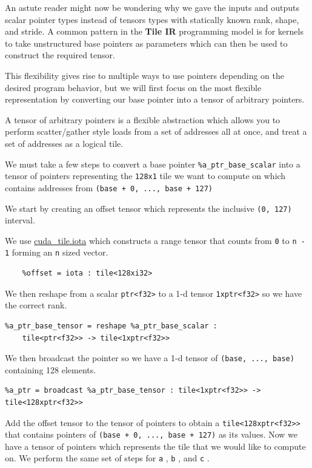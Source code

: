 \documentclass{article}
\begin{document}
An astute reader might now be wondering why we gave the inputs and outputs scalar pointer types instead of tensors types with statically known rank, shape, and stride. A common pattern in the \textbf{Tile IR} programming model is for kernels to take unstructured base pointers as parameters which can then be used to construct the required tensor.

This flexibility gives rise to multiple ways to use pointers depending on the desired program behavior, but we will first focus on the most flexible representation by converting our base pointer into a tensor of arbitrary pointers.

A tensor of arbitrary pointers is a flexible abstraction which allows you to perform scatter/gather style loads from a set of addresses all at once, and treat a set of addresses as a logical tile.


We must take a few steps to convert a base pointer \texttt{\%a\_ptr\_base\_scalar} into a tensor of pointers representing the \texttt{128x1} tile we want to compute on which contains addresses from \texttt{(base + 0, ..., base + 127)}


We start by creating an offset tensor which represents the inclusive \texttt{(0, 127)} interval.

We use \href{https://docs.nvidia.com/cuda/tile-ir/latest/sections/operations.html#op-cuda-tile-iota}{cuda\_tile.iota} which constructs a range tensor that counts from \texttt{0} to \texttt{n - 1} forming an \texttt{n} sized vector.


\begin{lstlisting}
    %offset = iota : tile<128xi32>
\end{lstlisting}

We then reshape from a scalar \texttt{ptr<f32>} to a 1-d tensor \texttt{1xptr<f32>} so we have the correct rank.


\begin{lstlisting}
%a_ptr_base_tensor = reshape %a_ptr_base_scalar :
    tile<ptr<f32>> -> tile<1xptr<f32>>
\end{lstlisting}

We then broadcast the pointer so we have a 1-d tensor of \texttt{(base, ..., base)} containing 128 elements.


\begin{lstlisting}
%a_ptr = broadcast %a_ptr_base_tensor : tile<1xptr<f32>> -> tile<128xptr<f32>>
\end{lstlisting}

Add the offset tensor to the tensor of pointers to obtain a \texttt{tile<128xptr<f32>>} that contains pointers of \texttt{(base + 0, ..., base + 127)} as its values. Now we have a tensor of pointers which represents the tile that we would like to compute on. We perform the same set of steps for \texttt{a} , \texttt{b} , and \texttt{c} .
\end{document}
